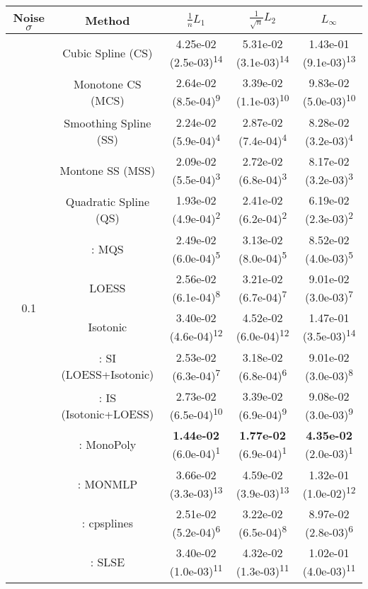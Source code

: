 \begin{tabular}{ccccc}
\toprule
Noise $\sigma$ & Method&$\frac 1n L_1$&$\frac{1}{\sqrt n}L_2$&$L_\infty$\tabularnewline
\midrule
\multirow{14}{*}{0.1}&Cubic Spline (CS)& 4.25e-02 (2.5e-03)\textsuperscript{14}& 5.31e-02 (3.1e-03)\textsuperscript{14}& 1.43e-01 (9.1e-03)\textsuperscript{13}\tabularnewline
&Monotone CS (MCS)& 2.64e-02 (8.5e-04)\textsuperscript{9}& 3.39e-02 (1.1e-03)\textsuperscript{10}& 9.83e-02 (5.0e-03)\textsuperscript{10}\tabularnewline
&Smoothing Spline (SS)& 2.24e-02 (5.9e-04)\textsuperscript{4}& 2.87e-02 (7.4e-04)\textsuperscript{4}& 8.28e-02 (3.2e-03)\textsuperscript{4}\tabularnewline
&Montone SS (MSS)& 2.09e-02 (5.5e-04)\textsuperscript{3}& 2.72e-02 (6.8e-04)\textsuperscript{3}& 8.17e-02 (3.2e-03)\textsuperscript{3}\tabularnewline
&Quadratic Spline (QS)& 1.93e-02 (4.9e-04)\textsuperscript{2}& 2.41e-02 (6.2e-04)\textsuperscript{2}& 6.19e-02 (2.3e-03)\textsuperscript{2}\tabularnewline
&\textcite{heMonotoneBsplineSmoothing1998}: MQS& 2.49e-02 (6.0e-04)\textsuperscript{5}& 3.13e-02 (8.0e-04)\textsuperscript{5}& 8.52e-02 (4.0e-03)\textsuperscript{5}\tabularnewline
&LOESS& 2.56e-02 (6.1e-04)\textsuperscript{8}& 3.21e-02 (6.7e-04)\textsuperscript{7}& 9.01e-02 (3.0e-03)\textsuperscript{7}\tabularnewline
&Isotonic& 3.40e-02 (4.6e-04)\textsuperscript{12}& 4.52e-02 (6.0e-04)\textsuperscript{12}& 1.47e-01 (3.5e-03)\textsuperscript{14}\tabularnewline
&\textcite{mammenEstimatingSmoothMonotone1991}: SI (LOESS+Isotonic)& 2.53e-02 (6.3e-04)\textsuperscript{7}& 3.18e-02 (6.8e-04)\textsuperscript{6}& 9.01e-02 (3.0e-03)\textsuperscript{8}\tabularnewline
&\textcite{mammenEstimatingSmoothMonotone1991}: IS (Isotonic+LOESS)& 2.73e-02 (6.5e-04)\textsuperscript{10}& 3.39e-02 (6.9e-04)\textsuperscript{9}& 9.08e-02 (3.0e-03)\textsuperscript{9}\tabularnewline
&\textcite{murrayFastFlexibleMethods2016a}: MonoPoly& \textbf{1.44e-02} (6.0e-04)\textsuperscript{1}& \textbf{1.77e-02} (6.9e-04)\textsuperscript{1}& \textbf{4.35e-02} (2.0e-03)\textsuperscript{1}\tabularnewline
&\textcite{cannonMonmlpMultilayerPerceptron2017}: MONMLP& 3.66e-02 (3.3e-03)\textsuperscript{13}& 4.59e-02 (3.9e-03)\textsuperscript{13}& 1.32e-01 (1.0e-02)\textsuperscript{12}\tabularnewline
&\textcite{navarro-garciaConstrainedSmoothingOutofrange2023}: cpsplines& 2.51e-02 (5.2e-04)\textsuperscript{6}& 3.22e-02 (6.5e-04)\textsuperscript{8}& 8.97e-02 (2.8e-03)\textsuperscript{6}\tabularnewline
&\textcite{groeneboomConfidenceIntervalsMonotone2023}: SLSE& 3.40e-02 (1.0e-03)\textsuperscript{11}& 4.32e-02 (1.3e-03)\textsuperscript{11}& 1.02e-01 (4.0e-03)\textsuperscript{11}\tabularnewline

\end{tabular}
